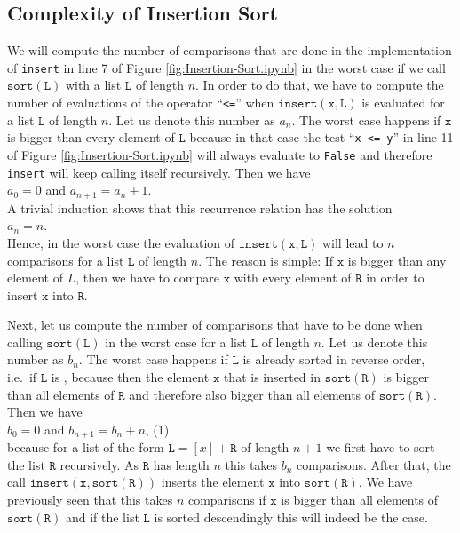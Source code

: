 \subsection{Complexity of Insertion Sort}
We will compute the number of comparisons that are done in the implementation of \texttt{insert}
in line 7 of Figure \ref{fig:Insertion-Sort.ipynb} in the worst case if we call $\texttt{sort}(\texttt{L})$ with a list
$\texttt{L}$ of length $n$. In order to do that, 
we have to compute the number of evaluations of the operator ``\texttt{<=}'' when 
 $\texttt{insert}(\texttt{x},\texttt{L})$ is evaluated for a list $\texttt{L}$ of length $n$.  Let us denote this number as 
$a_n$.  The worst case happens if $\texttt{x}$ is bigger than every element of $\texttt{L}$ because in that case the
test ``\texttt{x <= y}'' in line 11 of Figure \ref{fig:Insertion-Sort.ipynb} will always evaluate to
\texttt{False} and therefore \texttt{insert} will keep calling itself recursively.
Then we have
\\[0.2cm]
\hspace*{1.3cm}
$a_0 = 0$ \quad and \quad $a_{n+1} = a_n + 1$. 
\\[0.2cm]
A trivial induction shows that this recurrence relation has the solution
\\[0.2cm]
\hspace*{1.3cm} 
$a_n = n$.
\\[0.2cm]
Hence, in the worst case the evaluation of $\mathtt{insert}(\texttt{x},\texttt{L})$ will lead to $n$ comparisons for a list
$\texttt{L}$ of length $n$.  The reason is simple:  If $\texttt{x}$ is bigger than any element of $L$, then we have to
compare $\texttt{x}$ with every element of $\texttt{R}$ in order to insert $\texttt{x}$ into $\texttt{R}$.

Next, let us compute the number of comparisons that have to be done when calling
$\texttt{sort}(\texttt{L})$ in the worst case for a list  $\texttt{L}$ of length $n$.  Let us denote this number as
$b_n$. The worst case happens if $\texttt{L}$ is already sorted in reverse order, i.e.~if $\texttt{L}$ is
, because then the element $\texttt{x}$ that is inserted in
$\texttt{sort}(\texttt{R})$ is bigger than all elements 
of $\texttt{R}$ and therefore also bigger than all elements of $\texttt{sort}(\texttt{R})$.  Then we have \\[0.2cm]
\hspace*{1.3cm}
 $b_0 = 0$ \quad and \quad $b_{n+1} = b_n + n$, \hspace*{\fill} (1)
\\[0.2cm]
because for a list of the form $\texttt{L} = [x] + \texttt{R}$ of length $n+1$ we first have to sort the list $\texttt{R}$
recursively.  As $\texttt{R}$ has length $n$ this takes $b_n$ comparisons.  After that, the call
$\mathtt{insert}(\texttt{x}, \mathtt{sort(\texttt{R})})$ 
inserts the element $\texttt{x}$ into $\mathtt{sort}(\texttt{R})$.  We have previously seen that this takes $n$
comparisons if $\texttt{x}$ is bigger than all elements of $\mathtt{sort}(\texttt{R})$ and if the list $\texttt{L}$ is sorted
descendingly this will indeed be the case.

